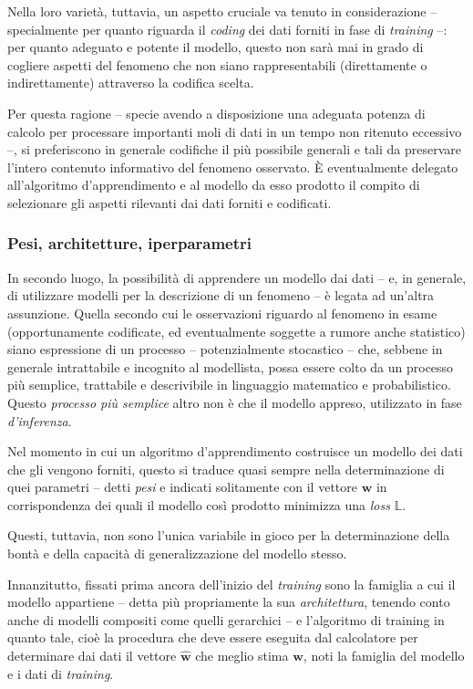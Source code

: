 \documentclass[a4paper, twoside]{article}
\begin{document}
Nella loro varietà, tuttavia, un aspetto cruciale va tenuto in considerazione -- specialmente per quanto riguarda il \textit{coding} dei dati forniti in fase di \textit{training} --: per quanto adeguato e potente il modello, questo non sarà mai in grado di cogliere aspetti del fenomeno che non siano rappresentabili (direttamente o indirettamente) attraverso la codifica scelta.

Per questa ragione -- specie avendo a disposizione una adeguata potenza di calcolo per processare importanti moli di dati in un tempo non ritenuto eccessivo --, si preferiscono in generale codifiche il più possibile generali e tali da preservare l'intero contenuto informativo del fenomeno osservato. È eventualmente delegato all'algoritmo d'apprendimento e al modello da esso prodotto il compito di selezionare gli aspetti rilevanti dai dati forniti e codificati.

\subsubsection{Pesi, architetture, iperparametri}

In secondo luogo, la possibilità di apprendere un modello dai dati -- e, in generale, di utilizzare modelli per la descrizione di un fenomeno -- è legata ad un'altra assunzione. Quella secondo cui le osservazioni riguardo al fenomeno in esame (opportunamente codificate, ed eventualmente soggette a rumore anche statistico) siano espressione di un processo -- potenzialmente stocastico -- che, sebbene in generale intrattabile e incognito al modellista, possa essere colto da un processo più semplice, trattabile e descrivibile in linguaggio matematico e probabilistico. Questo \textit{processo più semplice} altro non è che il modello appreso, utilizzato in fase \textit{d'inferenza}.

Nel momento in cui un algoritmo d'apprendimento costruisce un modello dei dati che gli vengono forniti, questo si traduce quasi sempre nella determinazione di quei parametri -- detti \textit{pesi} e indicati solitamente con il vettore $\boldsymbol{w}$ in corrispondenza dei quali il modello così prodotto minimizza una \textit{loss} $\mathbb{L}$.

Questi, tuttavia, non sono l'unica variabile in gioco per la determinazione della bontà e della capacità di generalizzazione del modello stesso.

Innanzitutto, fissati prima ancora dell'inizio del \textit{training} sono la famiglia a cui il modello appartiene -- detta più propriamente la sua \textit{architettura}, tenendo conto anche di modelli compositi come quelli gerarchici -- e l'algoritmo di training in quanto tale, cioè la procedura che deve essere eseguita dal calcolatore per determinare dai dati il vettore $\boldsymbol{\hat{w}}$ che meglio stima $\boldsymbol{w}$, noti la famiglia del modello e i dati di \textit{training}.
\end{document}
